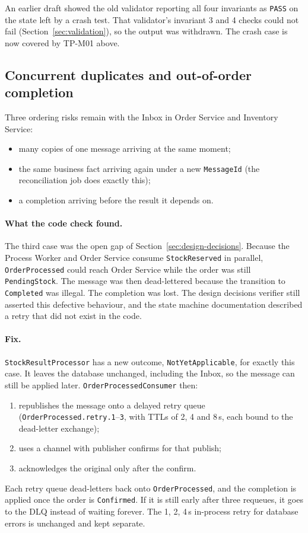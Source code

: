 \documentclass[a4paper]{report}
\begin{document}
An earlier draft showed the old validator reporting all four invariants as
\texttt{PASS} on the state left by a crash test. That validator's invariant 3
and 4 checks could not fail (Section~\ref{sec:validation}), so the output was
withdrawn. The crash case is now covered by TP-M01 above.

\subsection{Concurrent duplicates and out-of-order completion}

Three ordering risks remain with the Inbox in Order Service and Inventory Service:
\begin{itemize}
  \item many copies of one message arriving at the same moment;
  \item the same business fact arriving again under a new
    \texttt{MessageId} (the reconciliation job does exactly this);
  \item a completion arriving before the result it depends on.
\end{itemize}

\paragraph{What the code check found.} The third case was the open gap of
Section~\ref{sec:design-decisions}. Because the Process Worker and Order
Service consume \texttt{StockReserved} in parallel, \texttt{OrderProcessed}
could reach Order Service while the order was still \texttt{PendingStock}. The
message was then dead-lettered because the transition to \texttt{Completed}
was illegal. The completion was lost.
The design decisions verifier still asserted this defective behaviour, and the
state machine documentation described a retry that did not exist in the code.

\paragraph{Fix.} \texttt{StockResultProcessor} has a new outcome,
\texttt{NotYetApplicable}, for exactly this case. It leaves the database
unchanged, including the Inbox, so the message can still be applied later.
\texttt{OrderProcessedConsumer} then:
\begin{enumerate}
  \item republishes the message onto a delayed retry queue
    (\texttt{OrderProcessed.\allowbreak retry.1}--\texttt{3}, with TTLs of 2, 4 and
    8\,s, each bound to the dead-letter exchange);
  \item uses a channel with publisher confirms for that publish;
  \item acknowledges the original only after the confirm.
\end{enumerate}
Each retry queue dead-letters back onto \texttt{OrderProcessed}, and the
completion is applied once the order is \texttt{Confirmed}. If it is still
early after three requeues, it goes to the DLQ instead of waiting forever.
The 1, 2, 4\,s in-process retry for database errors is unchanged and kept
separate.
\end{document}

